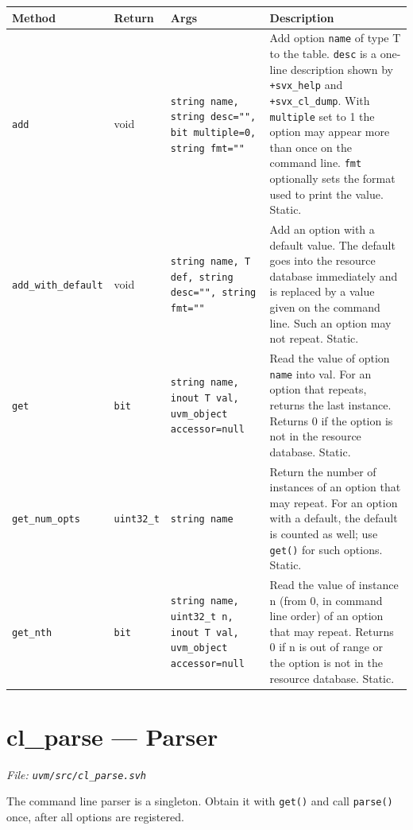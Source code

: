 \documentclass[11pt,letterpaper]{report}
\begin{document}
\begin{xltabular}{\linewidth}{>{\small}p{1.35in} >{\small}p{1.25in} >{\small}p{0.95in} >{\small}X}
\toprule
\textbf{Method} & \textbf{Return} & \textbf{Args} & \textbf{Description} \\
\midrule
\endhead
\bottomrule
\endfoot
\texttt{add} & void & \texttt{string name, string desc="", bit multiple=0, string fmt=""} & Add option \texttt{name} of type T to the table. \texttt{desc} is a one-line description shown by \texttt{+svx\_help} and \texttt{+svx\_cl\_dump}. With \texttt{multiple} set to 1 the option may appear more than once on the command line. \texttt{fmt} optionally sets the format used to print the value. Static. \\
\texttt{add\_with\_default} & void & \texttt{string name, T def, string desc="", string fmt=""} & Add an option with a default value. The default goes into the resource database immediately and is replaced by a value given on the command line. Such an option may not repeat. Static. \\
\texttt{get} & \texttt{bit} & \texttt{string name, inout T val, uvm\_object accessor=null} & Read the value of option \texttt{name} into val. For an option that repeats, returns the last instance. Returns 0 if the option is not in the resource database. Static. \\
\texttt{get\_num\_opts} & \texttt{uint32\_t} & \texttt{string name} & Return the number of instances of an option that may repeat. For an option with a default, the default is counted as well; use \texttt{get()} for such options. Static. \\
\texttt{get\_nth} & \texttt{bit} & \texttt{string name, uint32\_t n, inout T val, uvm\_object accessor=null} & Read the value of instance n (from 0, in command line order) of an option that may repeat. Returns 0 if n is out of range or the option is not in the resource database. Static. \\
\end{xltabular}

\section{cl\_parse --- Parser}
\noindent\small\textit{File: \texttt{uvm/src/cl\_parse.svh}}\par

The command line parser is a singleton. Obtain it with \texttt{get()} and call \texttt{parse()} once, after all options are registered.
\end{document}
